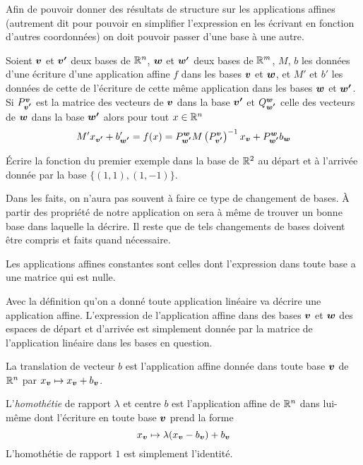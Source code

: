 \documentclass[11pt, a4paper]{article}
\begin{document}
Afin de pouvoir donner des résultats de structure sur les applications
affines (autrement dit pour pouvoir en simplifier l'expression en les
écrivant en fonction d'autres coordonnées) on doit pouvoir passer
d'une base à une autre.
\begin{prop}
  Soient $\boldsymbol{v}$ et $\boldsymbol{v'}$ deux bases de $\mathbb{R}^n$, $\boldsymbol{w}$ et
  $\boldsymbol{w'}$ deux bases de $\mathbb{R}^m$, $M$, $b$ les données d'une écriture
  d'une application affine $f$ dans les bases $\boldsymbol{v}$ et $\boldsymbol{w}$, et
  $M'$ et $b'$ les données de cette de l'écriture de cette même
  application dans les bases $\boldsymbol{w}$ et $\boldsymbol{w'}$. Si
  $P_{\boldsymbol{v'}}^{\boldsymbol{v}}$ est la matrice des vecteurs de $\boldsymbol{v}$ dans
  la base $\boldsymbol{v'}$ et $Q_{\boldsymbol{w'}}^{\boldsymbol{w}}$ celle des vecteurs de
  $\boldsymbol{w}$ dans la base $\boldsymbol{w'}$ alors pour tout $x \in \mathbb{R}^n$
  \[
  M'x_{\boldsymbol{v'}} + b'_{\boldsymbol{w'}} = f(x) =
  P_{\boldsymbol{w'}}^{\boldsymbol{w}}M\left(P_{\boldsymbol{v'}}^{\boldsymbol{v}}\right)^{-1}x_{\boldsymbol{v}}
  + P_{\boldsymbol{w'}}^{\boldsymbol{w}}b_{\boldsymbol{w}}
  \]
\end{prop}
\begin{question}
  Écrire la fonction du premier exemple dans la base de $\mathbb{R}^2$ au
  départ et à l'arrivée donnée par la base $\{(1, 1), (1, -1)\}$.
\end{question}
\begin{rem}
  Dans les faits, on n'aura pas souvent à faire ce type de changement
  de bases. À partir des propriété de notre application on sera à
  même de trouver un bonne base dans laquelle la décrire. Il reste que
  de tels changements de bases doivent être compris et faits quand
  nécessaire.
\end{rem}
\begin{exmp}
  Les applications affines constantes sont celles dont l'expression
  dans toute base a une matrice qui est nulle.
\end{exmp}
\begin{exmp}
  Avec la définition qu'on a donné toute application linéaire va
  décrire une application affine. L'expression de l'application affine
  dans des bases $\boldsymbol{v}$ et $\boldsymbol{w}$ des espaces de départ et
  d'arrivée est simplement donnée par la matrice de l'application
  linéaire dans les bases en question.
\end{exmp}
\begin{exmp}
  La translation de vecteur $b$ est l'application affine donnée dans
  toute base $\boldsymbol{v}$ de $\mathbb{R}^n$ par
  $x_{\boldsymbol{v}} \mapsto x_{\boldsymbol{v}} + b_{\boldsymbol{v}}$.
\end{exmp}
\begin{exmp}
  L'\emph{homothétie} de rapport $\lambda$ et centre $b$ est
  l'application affine de $\mathbb{R}^n$ dans lui-même dont l'écriture en
  toute base $\boldsymbol{v}$ prend la forme
  \[
  x_{\boldsymbol{v}} \mapsto \lambda (x_{\boldsymbol{v}}-b_{\boldsymbol{v}}) + b_{\boldsymbol{v}}
  \]
  L'homothétie de rapport $1$ est simplement l'identité.
\end{exmp}
\end{document}
